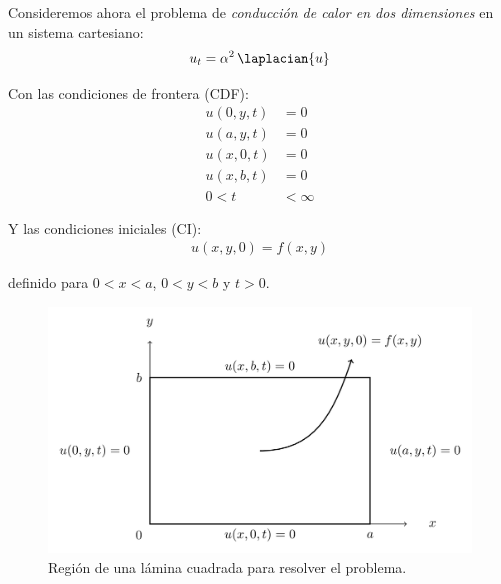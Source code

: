 Consideremos ahora el problema de \emph{conducción de calor en dos dimensiones} en un sistema cartesiano:
\begin{align}
u_{t} = \alpha^{2} \, \laplacian{u}
\label{eq:ecuacion_02_187}
\end{align}

Con las condiciones de frontera (CDF):
\begin{align}
u (0, y, t) &= 0 \label{eq:ecuacion_02_188} \\
u (a, y, t) &= 0 \label{eq:ecuacion_02_189} \\
u (x, 0, t) &= 0 \label{eq:ecuacion_02_190} \\
u (x, b, t) &= 0 \label{eq:ecuacion_02_191} \\
0 < t &< \infty \nonumber
\end{align}

Y las condiciones iniciales (CI):
\begin{align}
u (x, y, 0) = f (x, y) \label{eq:ecuacion_02_192}
\end{align}

definido para $0 < x < a$, $0  < y < b$ y $t > 0$.
\begin{figure}[H]
    \centering
    \includegraphics[scale=0.325]{Imagenes/Separacion_Variables_01_Lamina_Cuad.png}
    \caption{Región de una lámina cuadrada para resolver el problema.}
    \label{fig:figura_lamina_cuadrada}
\end{figure}

